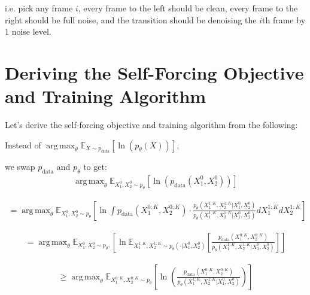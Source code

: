 \documentclass[11pt]{article}
\DeclareMathOperator*{\argmax}{arg\,max}
\begin{document}
i.e. pick any frame $i$, every frame to the left should be clean, every frame to the right should be full noise, and the transition should be denoising the $i$th frame by 1 noise level.


\section{Deriving the Self-Forcing Objective and Training Algorithm}

Let's derive the self-forcing objective and training algorithm from the following:

Instead of $\argmax_\theta \mathbb{E}_{X \sim p_{\text{data}}} \left[ \ln(p_\theta(X)) \right]$,

we swap $p_{\text{data}}$ and $p_\theta$ to get:
\begin{align}
\argmax_\theta \mathbb{E}_{X_1^0, X_2^0 \sim p_\theta} \left[ \ln(p_{\text{data}}(X_1^0, X_2^0)) \right]
\end{align}

\begin{align}
= \argmax_\theta \mathbb{E}_{X_1^0, X_2^0 \sim p_\theta} \left[ \ln \int p_{\text{data}}(X_1^{0:K}, X_2^{0:K}) \cdot \frac{p_\theta(X_1^{1:K}, X_2^{1:K} | X_1^0, X_2^0)}{p_\theta(X_1^{1:K}, X_2^{1:K} | X_1^0, X_2^0)} dX_1^{1:K} dX_2^{1:K} \right]
\end{align}

\begin{align}
= \argmax_\theta \mathbb{E}_{X_1^0, X_2^0 \sim p_\theta, } \left[ \ln \mathbb{E}_{X_1^{1:K}, X_2^{1:K} \sim p_\theta(\cdot | X_1^0, X_2^0)} \left[ \frac{p_{\text{data}}(X_1^{0:K}, X_2^{0:K})}{p_\theta(X_1^{1:K}, X_2^{1:K} | X_1^0, X_2^0)} \right] \right]
\end{align}

\begin{align}
\geq \argmax_\theta \mathbb{E}_{X_1^{0:K}, X_2^{0:K} \sim p_\theta} \left[ \ln \left( \frac{p_{\text{data}}(X_1^{0:K}, X_2^{0:K})}{p_\theta(X_1^{1:K}, X_2^{1:K} | X_1^0, X_2^0)} \right) \right]
\end{align}
\end{document}

